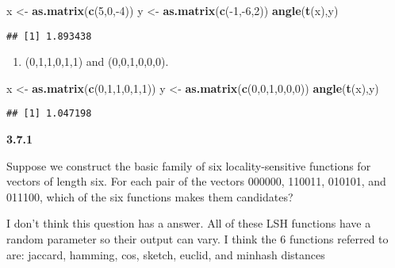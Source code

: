 \documentclass[]{article}
\newenvironment{Shaded}{\begin{snugshade}}{\end{snugshade}}
\newcommand{\KeywordTok}[1]{\textcolor[rgb]{0.13,0.29,0.53}{\textbf{{#1}}}}
\newcommand{\DecValTok}[1]{\textcolor[rgb]{0.00,0.00,0.81}{{#1}}}
\newcommand{\StringTok}[1]{\textcolor[rgb]{0.31,0.60,0.02}{{#1}}}
\newcommand{\NormalTok}[1]{{#1}}
\begin{document}
\begin{Shaded}
\begin{Highlighting}[]
\NormalTok{x <-}\StringTok{ }\KeywordTok{as.matrix}\NormalTok{(}\KeywordTok{c}\NormalTok{(}\DecValTok{5}\NormalTok{,}\DecValTok{0}\NormalTok{,-}\DecValTok{4}\NormalTok{))}
\NormalTok{y <-}\StringTok{ }\KeywordTok{as.matrix}\NormalTok{(}\KeywordTok{c}\NormalTok{(-}\DecValTok{1}\NormalTok{,-}\DecValTok{6}\NormalTok{,}\DecValTok{2}\NormalTok{))}
\KeywordTok{angle}\NormalTok{(}\KeywordTok{t}\NormalTok{(x),y)}
\end{Highlighting}
\end{Shaded}

\begin{verbatim}
## [1] 1.893438
\end{verbatim}

\begin{enumerate}
\def\labelenumi{(\alph{enumi})}
\setcounter{enumi}{3}
\itemsep1pt\parskip0pt
\item
  (0,1,1,0,1,1) and (0,0,1,0,0,0).
\end{enumerate}

\begin{Shaded}
\begin{Highlighting}[]
\NormalTok{x <-}\StringTok{ }\KeywordTok{as.matrix}\NormalTok{(}\KeywordTok{c}\NormalTok{(}\DecValTok{0}\NormalTok{,}\DecValTok{1}\NormalTok{,}\DecValTok{1}\NormalTok{,}\DecValTok{0}\NormalTok{,}\DecValTok{1}\NormalTok{,}\DecValTok{1}\NormalTok{))}
\NormalTok{y <-}\StringTok{ }\KeywordTok{as.matrix}\NormalTok{(}\KeywordTok{c}\NormalTok{(}\DecValTok{0}\NormalTok{,}\DecValTok{0}\NormalTok{,}\DecValTok{1}\NormalTok{,}\DecValTok{0}\NormalTok{,}\DecValTok{0}\NormalTok{,}\DecValTok{0}\NormalTok{))}
\KeywordTok{angle}\NormalTok{(}\KeywordTok{t}\NormalTok{(x),y)}
\end{Highlighting}
\end{Shaded}

\begin{verbatim}
## [1] 1.047198
\end{verbatim}

\textbf{3.7.1}

Suppose we construct the basic family of six locality-sensitive
functions for vectors of length six. For each pair of the vectors
000000, 110011, 010101, and 011100, which of the six functions makes
them candidates?

I don't think this question has a answer. All of these LSH functions
have a random parameter so their output can vary. I think the 6
functions referred to are: jaccard, hamming, cos, sketch, euclid, and
minhash distances
\end{document}
